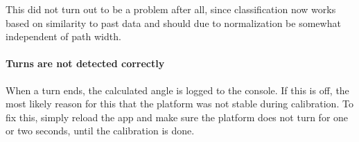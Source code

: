 This did not turn out to be a problem after all, since classification now works based on similarity to past data and should due to normalization be somewhat independent of path width.

\paragraph{Turns are not detected correctly} When a turn ends, the calculated angle is logged to the console. If this is off, the most likely reason for this that the platform was not stable during calibration. To fix this, simply reload the app and make sure the platform does not turn for one or two seconds, until the calibration is done.
